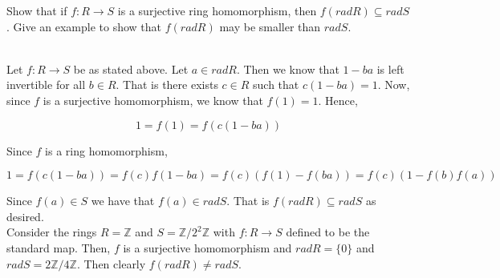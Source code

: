 Show that if $f:R\rightarrow S$ is a surjective ring homomorphism, then $f(rad R)\subseteq rad S$.
Give an example to show that $f(rad R)$ may be smaller than $rad S$.\\

\begin{solution}\renewcommand{\qedsymbol}{}\ \\
    Let $f:R\rightarrow S$ be as stated above. Let $a\in rad R$. Then we know that $1-ba$ is left
    invertible for all $b\in R$. That is there exists $c\in R$ such that $c(1-ba)=1$. Now, since $f$ is
    a surjective homomorphism, we know that $f(1)=1$. Hence, 

    $$1=f(1)=f(c(1-ba))$$

    Since $f$ is a ring homomorphism,

    $$1=f(c(1-ba))=f(c)f(1-ba)=f(c)(f(1)-f(ba))=f(c)(1-f(b)f(a))$$

    Since $f(a)\in S$ we have that $f(a)\in rad S$. That is $f(rad R)\subseteq rad S$ as desired.\\

    Consider the rings $R=\mathbb{Z}$ and $S=\mathbb{Z}/2^2\mathbb{Z}$ with $f:R\rightarrow S$ defined
    to be the standard map. Then, $f$ is a surjective homomorphism and $rad R=\{0\}$ and
    $rad S=2\mathbb{Z}/4\mathbb{Z}$. Then clearly $f(rad R)\neq rad S$.

\end{solution}